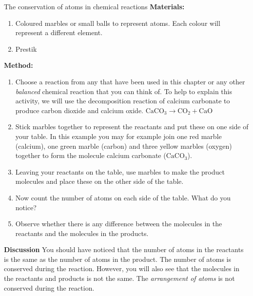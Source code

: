             \begin{activity}{The conservation of atoms in chemical reactions }
            \nopagebreak
            \label{m38711*id64844}\noindent{}\textbf{Materials:}
      \label{m38711*id64853}\begin{enumerate}[noitemsep, label=\textbf{\arabic*}. ] 
            \label{m38711*uid33}\item Coloured marbles or small balls to represent atoms. Each colour will represent a different element.
\label{m38711*uid34}\item Prestik
\end{enumerate}
        \par 
      \label{m38711*id64882}\noindent{}\textbf{Method:}
      \label{m38711*id64889}\begin{enumerate}[noitemsep, label=\textbf{\arabic*}. ] 
            \label{m38711*uid35}\item Choose a reaction from any that have been used in this chapter or any other \textsl{balanced} chemical reaction that you can think of. To help to explain this activity, we will use the decomposition reaction of calcium carbonate to produce carbon dioxide and calcium oxide.
${\mathrm{CaCO}}_{3}\to {\mathrm{CO}}_{2}+\mathrm{CaO}$
\label{m38711*uid36}\item Stick marbles together to represent the reactants and put these on one side of your table. In this example you may for example join one red marble (calcium), one green marble (carbon) and three yellow marbles (oxygen) together to form the molecule calcium carbonate (${\mathrm{CaCO}}_{3}$).
\label{m38711*uid37}\item Leaving your reactants on the table, use marbles to make the product molecules and place these on the other side of the table.
\label{m38711*uid38}\item Now count the number of atoms on each side of the table. What do you notice?
\label{m38711*uid39}\item Observe whether there is any difference between the molecules in the reactants and the molecules in the products.
\end{enumerate}
        \par 
      \label{m38711*id65031}\noindent{}\textbf{Discussion}
     You should have noticed that the number of atoms in the reactants is the same as the number of atoms in the product. The number of atoms is conserved during the reaction. However, you will also see that the molecules in the reactants and products is not the same. The \textsl{arrangement of atoms} is not conserved during the reaction.
 \par 
\end{activity}

